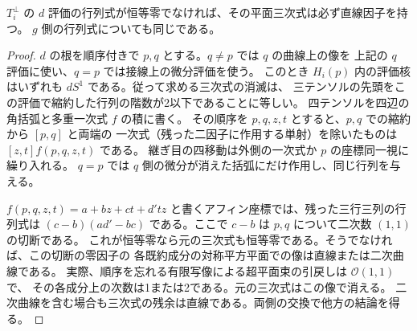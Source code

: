 \begin{proposition}\label{prop:twisted-cubic-secant-cubic}
$T_i^\perp$ の $d$ 評価の行列式が恒等零でなければ、その平面三次式は必ず直線因子を持つ。
$g$ 側の行列式についても同じである。
\end{proposition}
\begin{proof}
$d$ の根を順序付きで $p,q$ とする。$q\ne p$ では $q$ の曲線上の像を
上記の $q$ 評価に使い、$q=p$ では接線上の微分評価を使う。
このとき $H_i(p)$ 内の評価核はいずれも $d S^1$ である。従って求める三次式の消滅は、
三テンソルの先頭をこの評価で縮約した行列の階数が2以下であることに等しい。
四テンソルを四辺の角括弧と多重一次式 $f$ の積に書く。
その順序を $p,q,z,t$ とすると、$p,q$ での縮約から $[p,q]$ と両端の
一次式（残った二因子に作用する単射）を除いたものは $[z,t] f(p,q,z,t)$ である。
継ぎ目の四移動は外側の一次式か $p$ の座標同一視に繰り入れる。
$q=p$ では $q$ 側の微分が消えた括弧にだけ作用し、同じ行列を与える。

$f(p,q,z,t)=a+bz+ct+d'tz$ と書くアフィン座標では、残った三行三列の行列式は
$(c-b)(ad'-bc)$ である。ここで $c-b$ は $p,q$ について二次数 $(1,1)$ の切断である。
これが恒等零なら元の三次式も恒等零である。そうでなければ、この切断の零因子の
各既約成分の対称平方平面での像は直線または二次曲線である。
実際、順序を忘れる有限写像による超平面束の引戻しは $\mathcal O(1,1)$ で、
その各成分上の次数は1または2である。元の三次式はこの像で消える。
二次曲線を含む場合も三次式の残余は直線である。両側の交換で他方の結論を得る。
\end{proof}
